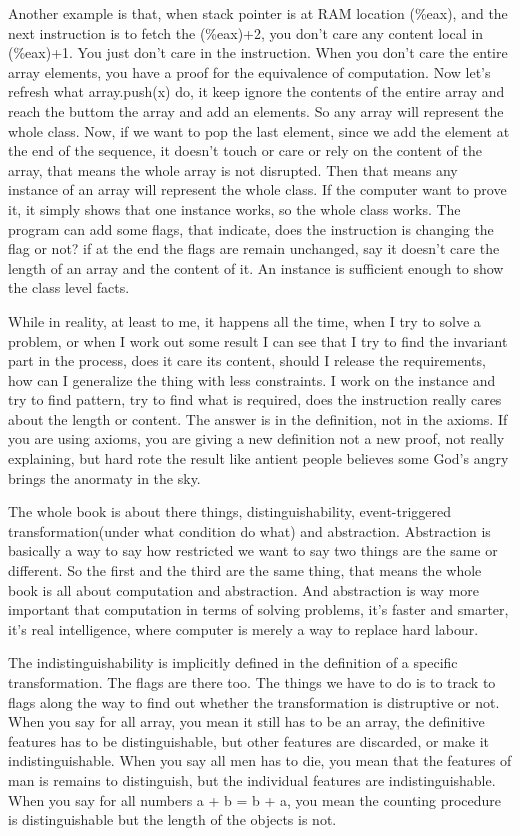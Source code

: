 Another example is that, when stack pointer is at RAM location (\%eax), and the next instruction is to fetch the (\%eax)+2, you don't care any content local in (\%eax)+1. You just don't care in the instruction. When you don't care the entire array elements, you have a proof for the equivalence of computation. Now let's refresh what array.push(x) do, it keep ignore the contents of the entire array and reach the buttom the array and add an elements. So any array will represent the whole class. Now, if we want to pop the last element, since we add the element at the end of the sequence, it doesn't touch or care or rely on the content of the array, that means the whole array is not disrupted. Then that means any instance of an array will represent the whole class. If the computer want to prove it, it simply shows that one instance works, so the whole class works. The program can add some flags, that indicate, does the instruction is changing the flag or not? if at the end the flags are remain unchanged, say it doesn't care the length of an array and the content of it. An instance is sufficient enough to show the class level facts.

While in reality, at least to me, it happens all the time, when I try to solve a problem, or when I work out some result I can see that I try to find the invariant part in the process, does it care its content, should I release the requirements, how can I generalize the thing with less constraints. I work on the instance and try to find pattern, try to find what is required, does the instruction really cares about the length or content. The answer is in the definition, not in the axioms. If you are using axioms, you are giving a new definition not a new proof, not really explaining, but hard rote the result like antient people believes some God's angry brings the anormaty in the sky.

The whole book is about there things, distinguishability, event-triggered transformation(under what condition do what) and abstraction. Abstraction is basically a way to say how restricted we want to say two things are the same or different. So the first and the third are the same thing, that means the whole book is all about computation and abstraction. And abstraction is way more important that computation in terms of solving problems, it's faster and smarter, it's real intelligence, where computer is merely a way to replace hard labour.

The indistinguishability is implicitly defined in the definition of a specific transformation. The flags are there too. The things we have to do is to track to flags along the way to find out whether the transformation is distruptive or not. When you say for all array, you mean it still has to be an array, the definitive features has to be distinguishable, but other features are discarded, or make it indistinguishable. When you say all men has to die, you mean that the features of man is remains to distinguish, but the individual features are indistinguishable. When you say for all numbers a + b = b + a, you mean the counting procedure is distinguishable but the length of the objects is not.


